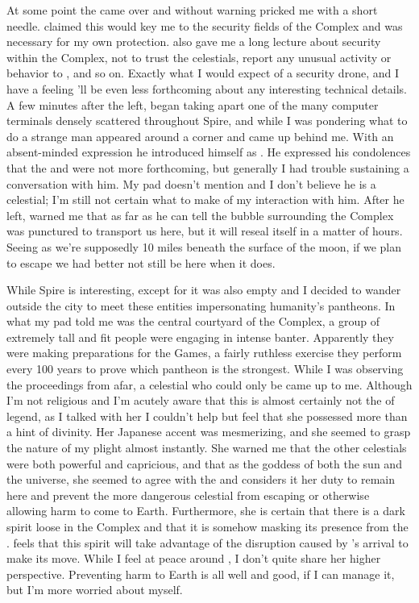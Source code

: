 \documentclass[char]{guardians}
\begin{document}
At some point the \cWarden{} came over and without warning pricked me with a short needle. \cWarden{\They} claimed this would key me to the security fields of the Complex and was necessary for my own protection. \cWarden{\They} also gave me a long lecture about security within the Complex, not to trust the celestials, report any unusual activity or behavior to \cWarden{\them}, and so on. Exactly what I would expect of a security drone, and I have a feeling \cWarden{\they}'ll be even less forthcoming about any interesting technical details. A few minutes after the \cWarden{} left, \cUnity{} began taking apart one of the many computer terminals densely scattered throughout Spire, and while I was pondering what to do a strange man appeared around a corner and came up behind me. With an absent-minded expression he introduced himself as \cJascha{\intro}. He expressed his condolences that the \cCaretaker{} and \cWarden{} were not more forthcoming, but generally I had trouble sustaining a conversation with him. My pad doesn't mention \cJascha{} and I don't believe he is a celestial; I'm still not certain what to make of my interaction with him. After he left, \cUnity{} warned me that as far as he can tell the bubble surrounding the Complex was punctured to transport us here, but it will reseal itself in a matter of hours. Seeing as we're supposedly 10 miles beneath the surface of the moon, if we plan to escape we had better not still be here when it does.

While Spire is interesting, except for \cUnity{} it was also empty and I decided to wander outside the city to meet these entities impersonating humanity's pantheons. In what my pad told me was the central courtyard of the Complex, a group of extremely tall and fit people were engaging in intense banter. Apparently they were making preparations for the Games, a fairly ruthless exercise they perform every 100 years to prove which pantheon is the strongest. While I was observing the proceedings from afar, a celestial who could only be \cAmaterasu{} came up to me. Although I'm not religious and I'm acutely aware that this is almost certainly not the \cAmaterasu{} of legend, as I talked with her I couldn't help but feel that she possessed more than a hint of divinity. Her Japanese accent was mesmerizing, and she seemed to grasp the nature of my plight almost instantly. She warned me that the other celestials were both powerful and capricious, and that as the goddess of both the sun and the universe, she seemed to agree with the \cWarden{} and considers it her duty to remain here and prevent the more dangerous celestial from escaping or otherwise allowing harm to come to Earth. Furthermore, she is certain that there is a dark spirit loose in the Complex and that it is somehow masking its presence from the \cWarden{}. \cAmaterasu{} feels that this spirit will take advantage of the disruption caused by \cUnity{}'s arrival to make its move. While I feel at peace around \cAmaterasu{}, I don't quite share her higher perspective. Preventing harm to Earth is all well and good, if I can manage it, but I'm more worried about myself.
                                                                                    
\end{document}
